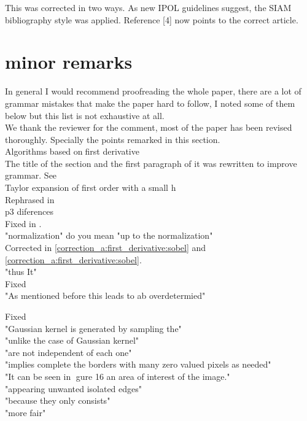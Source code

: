 \documentclass[a4paper,10pt]{report}
\begin{document}
\ans This was corrected in two ways. As new IPOL guidelines suggest, the SIAM bibliography style was applied. Reference [4] now points to the correct article.\\

\section{minor remarks}

\que In general I would recommend proofreading the whole paper, there are a lot of grammar
mistakes that make the paper hard to follow, I noted some of them below but this list is not exhaustive at all.\\

\ans We thank the reviewer for the comment, most of the paper has been revised thoroughly. Specially the points remarked in this section.\\

\que Algorithms based onfirst derivative \\
\ans The title of the section and the first paragraph of it was rewritten to improve grammar. See  \\

\que Taylor expansion of first order with a small h\\

\ans Rephrased in \\

\que p3 diferences\\

\ans Fixed in . \\

\que "normalization" do you mean "up to the normalization"\\

\ans Corrected in \ref{correction_a:first_derivative:sobel} and \ref{correction_a:first_derivative:sobel}.\\

\que "thus It"\\

\ans Fixed\\

\que "As mentioned before this leads to ab overdetermied"

\ans Fixed\\ 

\que "Gaussian kernel is generated by sampling the"\\
\que "unlike the case of Gaussian kernel"\\
\que "are not independent of each one"\\
\que "implies complete the borders with many zero valued pixels as needed"\\
\que "It can be seen in gure 16 an area of interest of the image."\\
\que "appearing unwanted isolated edges"\\
\que "because they only consists"\\
\que "more fair"\\
\end{document}
